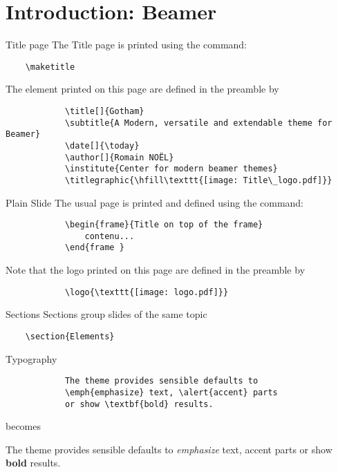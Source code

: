 \documentclass[aspectratio=169]{beamer}
\begin{document}
\section{Introduction: Beamer}

	\begin{frame}[fragile]{Title page}
		The Title page is printed using the command:			
		\begin{verbatim}    \maketitle\end{verbatim}
		
		The element printed on this page are defined in the preamble by
		\begin{verbatim}
			\title[]{Gotham}
			\subtitle{A Modern, versatile and extendable theme for Beamer}
			\date[]{\today}
			\author[]{Romain NOËL}
			\institute{Center for modern beamer themes}
			\titlegraphic{\hfill\texttt{[image: Title\_logo.pdf]}}
		\end{verbatim}
	\end{frame}
	
	\begin{frame}[fragile]{Plain Slide}
		The usual page is printed and defined using the command:			
		\begin{verbatim}
			\begin{frame}{Title on top of the frame}
				contenu...
			\end{frame }
		\end{verbatim}
		
		Note that the logo printed on this page are defined in the preamble by
		\begin{verbatim}
			\logo{\texttt{[image: logo.pdf]}}
		\end{verbatim}
	\end{frame}

	\begin{frame}[fragile]{Sections}
		Sections group slides of the same topic
		
		\begin{verbatim}    \section{Elements}\end{verbatim}
	\end{frame}

	\begin{frame}[fragile]{Typography}
		\begin{verbatim}
			The theme provides sensible defaults to
			\emph{emphasize} text, \alert{accent} parts
			or show \textbf{bold} results.
		\end{verbatim}
		
		\begin{center}becomes\end{center}
		
		The theme provides sensible defaults to \emph{emphasize} text,
		\alert{accent} parts or show \textbf{bold} results.
	\end{frame}
		
\end{document}
